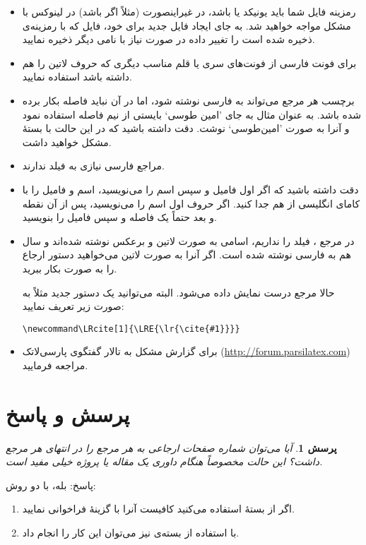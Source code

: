 \documentclass{article}
\theoremstyle{plain}\newtheorem{question}{پرسش}
\newcommand{\answer}{{\noindent \Sayeh پاسخ: }}
\begin{document}
\begin{itemize}
\item رمزینه فایل  شما باید یونیکد یا  باشد، در غیراینصورت (مثلاً اگر   باشد) در لینوکس با مشکل مواجه خواهید شد. به جای ایجاد فایل  جدید برای خود،  فایل  که با رمزینه‌ی  ذخیره شده است را تغییر داده در صورت نیاز با نامی دیگر ذخیره نمایید. 
\item برای فونت فارسی از فونت‌های سری  یا قلم مناسب دیگری که حروف لاتین را هم داشته باشد استفاده نمایید.
\item برچسب‌ هر مرجع می‌تواند به فارسی نوشته شود، اما در آن نباید فاصله بکار برده شده باشد. 
به عنوان مثال به جای 'امین طوسی` بایستی از نیم فاصله استفاده نمود و آنرا به صورت 'امین‌طوسی` نوشت. دقت داشته باشید که در این حالت با بستهٔ  مشکل خواهید داشت.
\item مراجع فارسی نیازی به فیلد  ندارند.
\item دقت داشته باشید که اگر اول فامیل و سپس اسم را می‌نویسید، اسم و فامیل را با کامای انگلیسی از هم جدا کنید. اگر حروف اول اسم را می‌نویسید، پس از آن نقطه و بعد حتماً یک فاصله و سپس فامیل را بنویسید.
\item در مرجع \cite{Baker02limits}،  فیلد  را نداریم، اسامی به صورت لاتین و برعکس نوشته شده‌اند و سال هم به فارسی نوشته شده است. اگر آنرا به صورت لاتین می‌خواهید دستور ارجاع را به صورت  بکار ببرید.

 حالا مرجع  درست نمایش داده می‌شود. البته می‌توانید یک دستور جدید مثلاً به صورت زیر تعریف نمایید:
\begin{latin}
\begin{verbatim}
\newcommand\LRcite[1]{\LRE{\lr{\cite{#1}}}}
\end{verbatim}
\end{latin}

\item  برای گزارش مشکل به تالار گفتگوی پارسی‌لاتک (\url{http://forum.parsilatex.com}) مراجعه فرمایید.

\end{itemize}

\section{پرسش و پاسخ} 
\begin{question} آیا می‌توان شماره صفحات ارجاعی به هر مرجع را در انتهای هر مرجع داشت؟ این حالت مخصوصاً هنگام‌ داوری یک مقاله یا پروژه 
خیلی مفید است.
\end{question}
\answer
بله، با دو روش:
\begin{enumerate}
\item
اگر از بستهٔ  استفاده می‌کنید کافیست آنرا با گزینهٔ  فراخوانی نمایید.
\item
با استفاده از بسته‌ی  نیز می‌توان این کار را انجام داد.
\end{enumerate}
\end{document}
